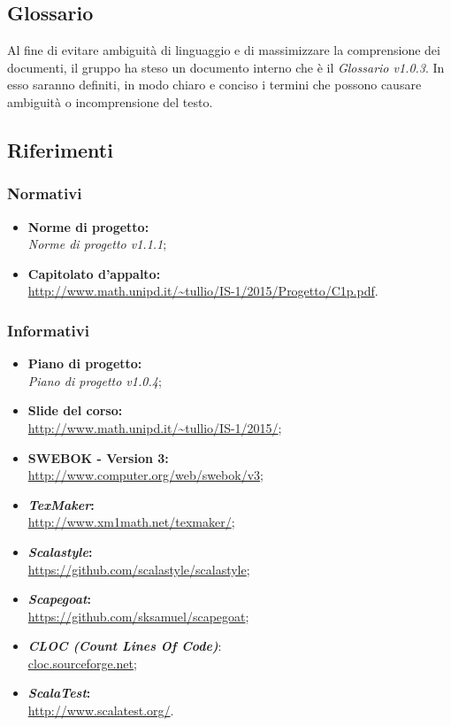 \documentclass[a4paper]{article}
\begin{document}
		\subsection{Glossario}
			Al fine di evitare ambiguità di linguaggio e di massimizzare la comprensione dei documenti, il 
	      gruppo ha steso un documento interno che è il \emph{Glossario v1.0.3}. In esso saranno definiti, in modo
	      chiaro e conciso i termini che possono causare ambiguità o incomprensione del testo.
		\subsection{Riferimenti}
			\subsubsection{Normativi}
				\begin{itemize}
					\item \textbf{Norme di progetto:} \\ \emph{Norme di progetto v1.1.1};
					\item \textbf{Capitolato d'appalto:} \\ \url{http://www.math.unipd.it/~tullio/IS-1/2015/Progetto/C1p.pdf}.
				\end{itemize}
			\subsubsection{Informativi}
				\begin{itemize}
					\item \textbf{Piano di progetto:} \\ \emph{Piano di progetto v1.0.4};
					\item \textbf{Slide del corso:} \\ \url{http://www.math.unipd.it/~tullio/IS-1/2015/};
					\item \textbf{SWEBOK - Version 3:} \\ \url{http://www.computer.org/web/swebok/v3};
					\item \textbf{\emph{TexMaker}:}\\ \url{http://www.xm1math.net/texmaker/};
				    \item \textbf{\emph{Scalastyle}:}\\ \url{https://github.com/scalastyle/scalastyle};
					\item \textbf{\emph{Scapegoat}:}\\ \url{https://github.com/sksamuel/scapegoat};
					\item \textbf{\emph{CLOC (Count Lines Of Code)}}:\\ \url{cloc.sourceforge.net};
					\item \textbf{\emph{ScalaTest}:}\\ \url{http://www.scalatest.org/}.
				\end{itemize}
\end{document}
